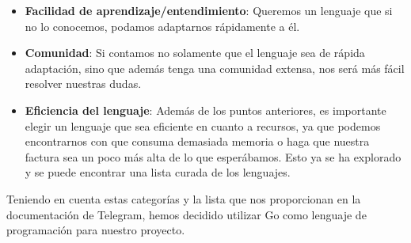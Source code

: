 \begin{itemize}
    \item \textbf{Facilidad de aprendizaje/entendimiento}: Queremos un lenguaje que 
    si no lo conocemos, podamos adaptarnos rápidamente a él.
    \item \textbf{Comunidad}: Si contamos no solamente que el lenguaje sea de
    rápida adaptación, sino que además tenga una comunidad extensa, nos será más 
    fácil resolver nuestras dudas.
    \item \textbf{Eficiencia del lenguaje}: Además de los puntos anteriores, es 
    importante elegir un lenguaje que sea eficiente en cuanto a recursos, ya que 
    podemos encontrarnos con que consuma demasiada memoria o haga que nuestra 
    factura sea un poco más alta de lo que esperábamos. Esto ya se ha explorado y 
    se puede encontrar una lista curada \cite{eficiencia} de los lenguajes.
\end{itemize}

Teniendo en cuenta estas categorías y la lista que nos proporcionan en la 
documentación de Telegram, hemos decidido utilizar Go como lenguaje de programación 
para nuestro proyecto.